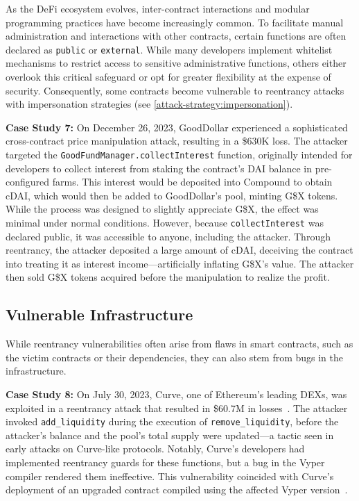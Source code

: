 As the DeFi ecosystem evolves, inter-contract interactions and modular programming practices have become increasingly common. To facilitate manual administration and interactions with other contracts, certain functions are often declared as \lstinline{public} or \lstinline{external}. While many developers implement whitelist mechanisms to restrict access to sensitive administrative functions, others either overlook this critical safeguard or opt for greater flexibility at the expense of security. Consequently, some contracts become vulnerable to reentrancy attacks with impersonation strategies (see \ref{attack-strategy:impersonation}).

\textbf{Case Study 7:} \label{case-study:7} On December 26, 2023, GoodDollar experienced a sophisticated cross-contract price manipulation attack, resulting in a \$630K loss. The attacker targeted the \lstinline{GoodFundManager.collectInterest} function, originally intended for developers to collect interest from staking the contract's DAI balance in pre-configured farms. This interest would be deposited into Compound to obtain cDAI, which would then be added to GoodDollar's pool, minting G\$X tokens. While the process was designed to slightly appreciate G\$X, the effect was minimal under normal conditions. However, because \lstinline{collectInterest} was declared public, it was accessible to anyone, including the attacker. Through reentrancy, the attacker deposited a large amount of cDAI, deceiving the contract into treating it as interest income—artificially inflating G\$X's value. The attacker then sold G\$X tokens acquired before the manipulation to realize the profit.


\subsection{Vulnerable Infrastructure}

While reentrancy vulnerabilities often arise from flaws in smart contracts, such as the victim contracts or their dependencies, they can also stem from bugs in the infrastructure.

\textbf{Case Study 8:} \label{case-study:8} On July 30, 2023, Curve, one of Ethereum's leading DEXs, was exploited in a reentrancy attack that resulted in \$60.7M in losses~\cite{attack-report:curve}. The attacker invoked \lstinline{add_liquidity} during the execution of \lstinline{remove_liquidity}, before the attacker's balance and the pool's total supply were updated—a tactic seen in early attacks on Curve-like protocols. Notably, Curve's developers had implemented reentrancy guards for these functions, but a bug in the Vyper compiler rendered them ineffective. This vulnerability coincided with Curve's deployment of an upgraded contract compiled using the affected Vyper version~\cite{vul-report:vyper}.

